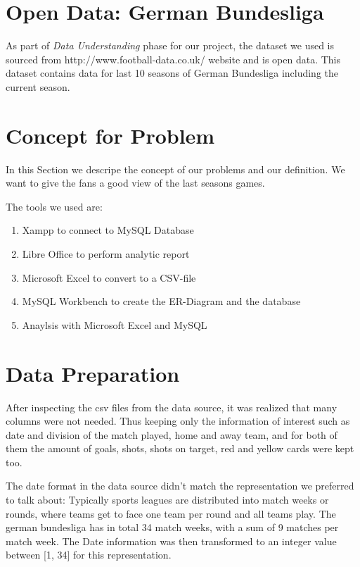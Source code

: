 \documentclass[11pt, journal]{IEEEtran}
\begin{document}
\section{Open Data: German Bundesliga } \label{sec:dataunderstanding}
As part of \emph{Data Understanding}  phase for our project, the dataset we used is sourced from http://www.football-data.co.uk/ website and is open data. This dataset contains data for last 10 seasons of German Bundesliga including the current season.
\section{Concept for Problem} \label{sec:concept}
In this Section we descripe the concept of our problems and our definition.
We want to give the fans a good view of the last seasons games.

The tools we used are: 
\begin{enumerate}
\item Xampp to connect to MySQL Database
\item Libre Office to perform analytic report
\item Microsoft Excel to convert to a CSV-file
\item MySQL Workbench to create the ER-Diagram and the database
\item Anaylsis with Microsoft Excel and MySQL
\end{enumerate}
 
\section{Data Preparation} \label{sec:impl}
After inspecting the csv files from the data source, it was realized that many columns were not needed. Thus keeping only
the information of interest such as date and division of the match played, home and away team, and for both of them the amount of goals,
shots, shots on target, red and yellow cards were kept too.

The date format in the data source didn't match the representation we preferred to talk about: Typically sports leagues are distributed into 
match weeks or rounds, where teams get to face one team per round and all teams play. The german bundesliga has in total 34 match weeks, with a
sum of 9 matches per match week. The Date information was then transformed to an integer value between [1, 34] for this representation.
\end{document}
